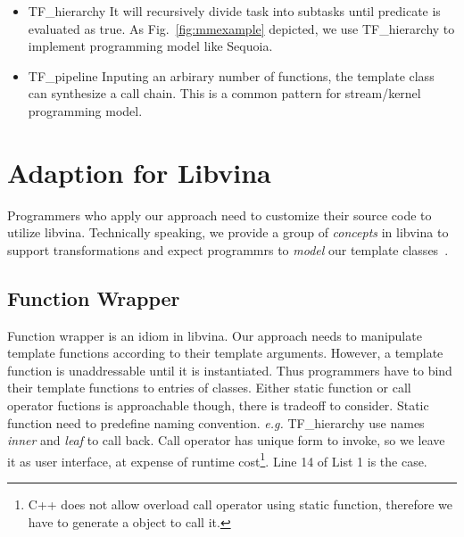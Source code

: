 \begin{itemize} 
\item TF\_hierarchy It will recursively divide task into subtasks until
  predicate is evaluated as true. As Fig.~\ref{fig:mmexample} depicted,  we use
  TF\_hierarchy to implement programming model like Sequoia.

\item TF\_pipeline Inputing an arbirary number of functions, the template
  class can synthesize a call chain. This is a common pattern for
  stream/kernel programming model.
\end{itemize} 

\section{Adaption for Libvina}\label{sec:adaption}
Programmers who apply our approach need to customize their source code
to utilize libvina. Technically speaking, we provide a group of \emph{concepts}
in libvina to support transformations and expect programmrs to \textit{model} our template classes~\cite{tempmetaprog}. 

\subsection{Function Wrapper}
Function wrapper is an idiom in libvina. Our approach needs to manipulate
template functions according to their template arguments. However, a
template function is unaddressable until it is
instantiated. Thus programmers have to bind their template functions
to entries of classes.  Either static function or call operator
fuctions is approachable though,
there is tradeoff to consider. Static function need to predefine naming convention. 
\textit{e.g.} TF\_hierarchy use names \textit{inner} and
\textit{leaf} to call back. Call operator has unique form to invoke, so we leave it
as user interface, at expense of runtime
cost\footnote{C++ does not allow overload call operator using static
  function, therefore we have to generate a object to call it.}. Line 14
of List 1 is the case.


